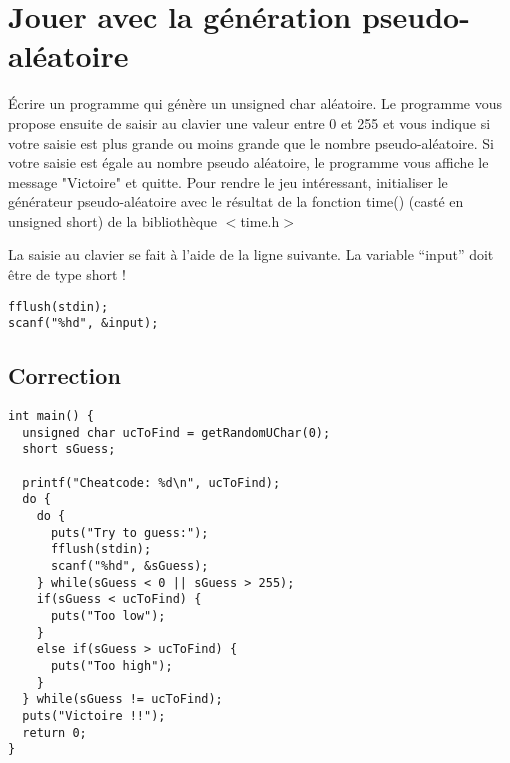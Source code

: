 \documentclass[10pt]{article}
\begin{document}
\section{Jouer avec la génération pseudo-aléatoire}
\'Ecrire un programme qui génère un unsigned char aléatoire. Le programme vous propose ensuite de saisir au clavier une valeur entre 0 et 255 et vous indique si votre saisie est plus grande ou moins grande que le nombre pseudo-aléatoire. Si votre saisie est égale au nombre pseudo aléatoire, le programme vous affiche le message "Victoire" et quitte.
Pour rendre le jeu intéressant, initialiser le générateur pseudo-aléatoire avec le résultat de la fonction time() (casté en unsigned short) de la bibliothèque $<$time.h$>$
\par
La saisie au clavier se fait à l'aide de la ligne suivante. La variable ``input'' doit être de type short !
\begin{verbatim}
fflush(stdin);
scanf("%hd", &input);
\end{verbatim}

\subsection{Correction}
\begin{verbatim}
int main() {
  unsigned char ucToFind = getRandomUChar(0);
  short sGuess;

  printf("Cheatcode: %d\n", ucToFind);
  do { 
    do {
      puts("Try to guess:");
      fflush(stdin);
      scanf("%hd", &sGuess);
    } while(sGuess < 0 || sGuess > 255);
    if(sGuess < ucToFind) {
      puts("Too low");
    }
    else if(sGuess > ucToFind) {
      puts("Too high");
    }
  } while(sGuess != ucToFind);
  puts("Victoire !!");
  return 0; 
}
\end{verbatim}

%
%
\end{document}
